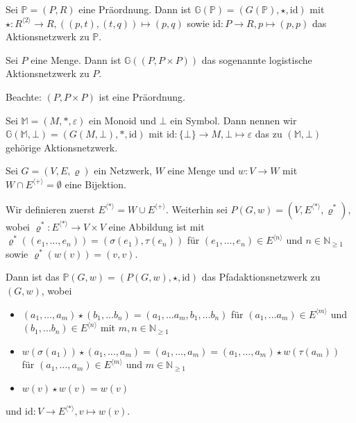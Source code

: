 \documentclass{article}
\begin{document}
\begin{example}
  Sei $\mathbb{P} = (P, R)$ eine Präordnung.
  Dann ist $\mathbb{G}(\mathbb{P}) = (G(\mathbb{P}), \star, \text{id})$
  mit  $\star \colon R^{\langle 2 \rangle} \to R, ((p, t), (t, q)) \mapsto (p, q)$
  sowie $\text{id} \colon P \to R, p \mapsto (p, p)$
  das Aktionsnetzwerk zu $\mathbb{P}$.
\end{example}

\begin{example}
  Sei $P$ eine Menge. Dann ist $\mathbb{G}((P, P \times P))$
  das sogenannte logistische Aktionsnetzwerk zu $P$.

  Beachte: $(P, P \times P)$ ist eine Präordnung.
\end{example}

\begin{example}
  Sei $\mathbb{M} = (M, \ast, \varepsilon)$ ein Monoid und $\bot$ ein Symbol.
  Dann nennen wir $\mathbb{G}(\mathbb{M}, \bot) = (G(M, \bot), \ast, \text{id})$
  mit $\text{id} \colon \{\bot\} \to M, \bot \mapsto \varepsilon$
  das zu $(\mathbb{M}, \bot)$ gehörige Aktionsnetzwerk.
\end{example}

\begin{example}
  Sei $G = (V, E, \varrho)$ ein Netzwerk, $W$ eine Menge und $w \colon V \to W$
  mit $W \cap E^{\langle + \rangle} = \emptyset$ eine Bijektion.

  Wir definieren zuerst $E^{\langle \ast \rangle} = W \cup E^{\langle + \rangle}$.
  Weiterhin sei $P(G, w) = (V, E^{\langle \ast \rangle}, \varrho^\ast)$,
  wobei $\varrho^\ast \colon E^{\langle \ast \rangle} \to V \times V$
  eine Abbildung ist mit $\varrho^\ast((e_1, \dots, e_n)) = (\sigma(e_1), \tau(e_n))$
  für $(e_1, \dots, e_n) \in E^{\langle n \rangle}$ und $n \in \mathbb{N}_{\geq 1}$
  sowie $\varrho^\ast(w(v)) = (v, v)$.

  Dann ist das $\mathbb{P}(G, w) = (P(G, w), \star, \text{id})$ 
  das Pfadaktionsnetzwerk zu $(G, w)$,
  wobei
  \begin{itemize}
    \item $(a_1, \dots, a_m) \star (b_1, \dots b_n) = (a_1, \dots a_m, b_1, \dots b_n)$
          für $(a_1, \dots a_m) \in E^{\langle m \rangle}$
          und $(b_1, \dots b_n) \in E^{\langle n \rangle}$
          mit $m, n \in \mathbb{N}_{\geq 1}$
    \item $w(\sigma(a_1)) \star (a_1, \dots, a_m) = (a_1, \dots, a_m) = (a_1, \dots, a_m) \star w(\tau(a_m))$
          für $(a_1, \dots, a_m) \in E^{\langle m \rangle}$ und $m \in \mathbb{N}_{\geq 1}$
    \item $w(v) \star w(v) = w(v)$
  \end{itemize}
  und $\text{id} \colon V \to E^{\langle \ast \rangle}, v \mapsto w(v)$.
\end{example}
\end{document}
